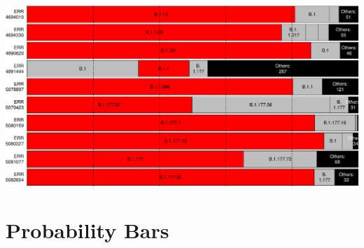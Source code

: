 \documentclass[]{article}
\begin{document}
\includegraphics{pangolin_results_report_files/figure-latex/pareto-1.pdf}

\hypertarget{probability-bars}{%
\section{Probability Bars}\label{probability-bars}}
\end{document}

